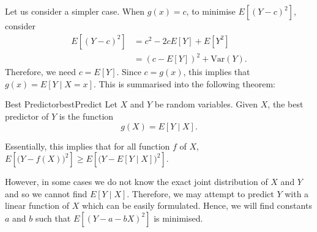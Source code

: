 \documentclass[math]{amznotes}
\theoremstyle{remark}
\begin{document}
Let us consider a simpler case. When $g(x) = c$, to minimise $E\left[(Y - c)^2\right]$, consider
\begin{align*}
    E\left[(Y - c)^2\right] & = c^2 - 2cE[Y] + E\left[Y^2\right] \\
    & = \left(c - E[Y]\right)^2 + \mathrm{Var}(Y).
\end{align*}
Therefore, we need $c = E[Y]$. Since $c = g(x)$, this implies that $g(x) = E[Y \mid X = x]$. This is summarised into the following theorem:
\begin{thmbox}{Best Predictor}{bestPredict}
    Let $X$ and $Y$ be random variables. Given $X$, the best predictor of $Y$ is the function 
    \begin{equation*}
        g(X) = E[Y \mid X].
    \end{equation*}
\end{thmbox}
Essentially, this implies that for all function $f$ of $X$, $E\left[\bigl(Y - f(X)\bigr)^2\right] \geq E\left[\bigl(Y - E[Y \mid X]\bigr)^2\right]$.

However, in some cases we do not know the exact joint distribution of $X$ and $Y$ and so we cannot find $E[Y \mid X]$. Therefore, we may attempt to predict $Y$ with a linear function of $X$ which can be easily formulated. Hence, we will find constants $a$ and $b$ such that $E\left[(Y - a - bX)^2\right]$ is minimised.
\end{document}
